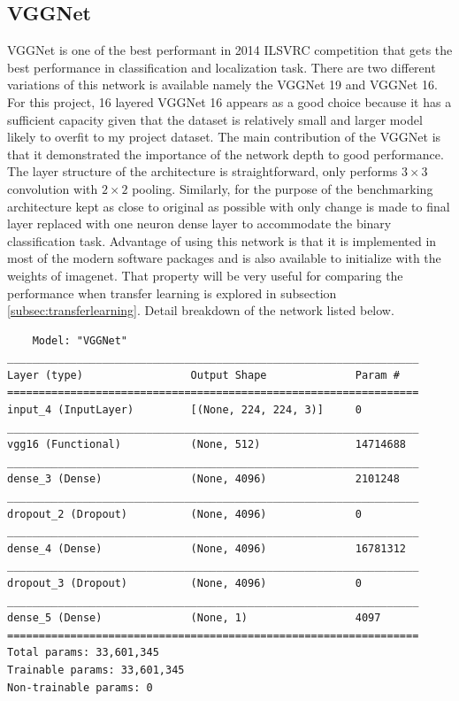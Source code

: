 \subsection{VGGNet}
VGGNet is one of the best performant in 2014 ILSVRC competition that gets the best performance in classification and localization task.
There are two different variations of this network is available namely the VGGNet 19 and VGGNet 16. 
For this project, 16 layered VGGNet 16 appears as a good choice because it has a sufficient capacity given that the dataset is relatively small and larger model likely to overfit to my project dataset.
The main contribution of the VGGNet is that it demonstrated the importance of the network depth to good performance.
The layer structure of the architecture is straightforward, only performs $3 \times 3$ convolution with $2 \times 2$ pooling.
Similarly, for the purpose of the benchmarking architecture kept as close to original as possible with only change is made to final layer replaced with one neuron dense layer to accommodate the binary classification task.
Advantage of using this network is that it is implemented in most of the modern software packages and is also available to initialize with the weights of imagenet. 
That property will be very useful for comparing the performance when transfer learning is explored in subsection \ref{subsec:transferlearning}.
Detail breakdown of the network listed below.

\begin{verbatim}
    Model: "VGGNet"
_________________________________________________________________
Layer (type)                 Output Shape              Param #   
=================================================================
input_4 (InputLayer)         [(None, 224, 224, 3)]     0         
_________________________________________________________________
vgg16 (Functional)           (None, 512)               14714688  
_________________________________________________________________
dense_3 (Dense)              (None, 4096)              2101248   
_________________________________________________________________
dropout_2 (Dropout)          (None, 4096)              0         
_________________________________________________________________
dense_4 (Dense)              (None, 4096)              16781312  
_________________________________________________________________
dropout_3 (Dropout)          (None, 4096)              0         
_________________________________________________________________
dense_5 (Dense)              (None, 1)                 4097      
=================================================================
Total params: 33,601,345
Trainable params: 33,601,345
Non-trainable params: 0

\end{verbatim}

